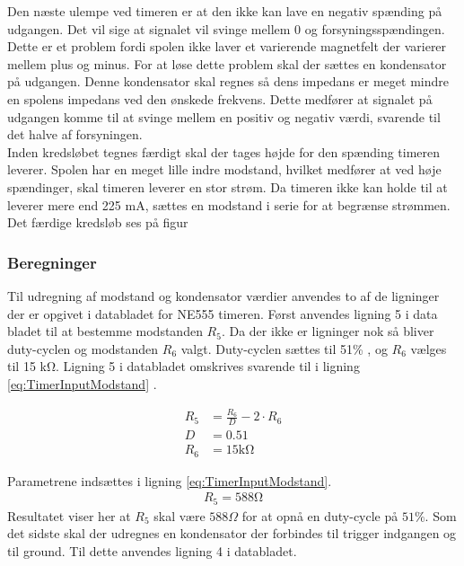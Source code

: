 Den næste ulempe ved timeren er at den ikke kan lave en negativ spænding på udgangen. 
Det vil sige at signalet vil svinge mellem 0 og forsyningsspændingen. 
Dette er et problem fordi spolen ikke laver et varierende magnetfelt der varierer mellem plus og minus. For at løse dette problem skal der sættes en kondensator på udgangen. 
Denne kondensator skal regnes så dens impedans er meget mindre en spolens impedans ved den ønskede frekvens. 
Dette medfører at signalet på udgangen komme til at svinge mellem en positiv og negativ værdi, svarende til det halve af forsyningen.\\

Inden kredsløbet tegnes færdigt skal der tages højde for den spænding timeren leverer. 
Spolen har en meget lille indre modstand, hvilket medfører at ved høje spændinger, skal timeren leverer en stor strøm. 
Da timeren ikke kan holde til at leverer mere end 225 \si{\milli\ampere}, sættes en modstand i serie for at begrænse strømmen. 
Det færdige kredsløb ses på figur 

\subsubsection{Beregninger}
Til udregning af modstand og kondensator værdier anvendes to af de ligninger der er opgivet i databladet for NE555 timeren. 
Først anvendes ligning 5 i data bladet til at bestemme modstanden $R_5$. 
Da der ikke er ligninger nok så bliver duty-cyclen og modstanden $R_6$ valgt. 
Duty-cyclen sættes til 51\%  , og $R_6$ vælges til 15 \si{\kilo\ohm}. 
Ligning 5 i databladet omskrives svarende til i ligning \ref{eq:TimerInputModstand} .

\begin{align}
R_5 & = \frac{R_6}{D} - 2 \cdot R_6 \label{eq:TimerInputModstand} \\
D & = 0.51 \nonumber \\
R_6 & = 15 \si{\kilo \ohm} \nonumber
\end{align}

Parametrene indsættes i ligning \ref{eq:TimerInputModstand}.
\begin{align}
R_5 = 588 \si{\ohm} \label{eq:InputBeregnet}
\end{align}
Resultatet viser her at $R_5$ skal være $588 \Omega $ for at opnå en duty-cycle på $51 \% $.
Som det sidste skal der udregnes en kondensator der forbindes til trigger indgangen og til ground. 
Til dette anvendes ligning 4 i databladet. 


